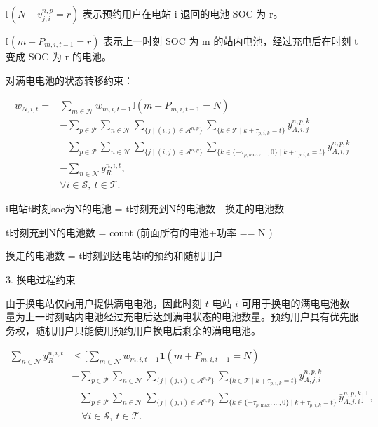 \documentclass[12pt,hyperref,a4paper,UTF8]{ctexart}
\begin{document}
$\mathbb{I}\!\left(N-v^{n,p}_{j,i}=r\right)$
表示预约用户在电站 i 退回的电池 SOC 为 r。

$\mathbb{I}\!\left(m+P_{m,i,t-1}=r\right)$
表示上一时刻 SOC 为 m 的站内电池，经过充电后在时刻 t 变成 SOC 为 r 的电池。

对满电电池的状态转移约束：

\begin{equation}
\begin{aligned}
w_{N,i,t}
=&
\sum_{m\in \mathcal{N}}
w_{m,i,t-1}
\mathbb{I}\!\left(m+P_{m,i,t-1}=N\right)
\\
&-
\sum_{p\in \mathcal{P}}
\sum_{n\in \mathcal{N}}
\sum_{\{j\mid (i,j)\in \mathcal{A}^{n,p}\}}
\sum_{\{k\in \mathcal{T}\mid k+\tau_{p,i,k}=t\}}
y^{n,p,k}_{A,i,j}
\\
&-
\sum_{p\in \mathcal{P}}
\sum_{n\in \mathcal{N}}
\sum_{\{j\mid (i,j)\in \mathcal{A}^{n,p}\}}
\sum_{\{k\in \{-\tau_{p,max},\ldots,0\}\mid k+\tau_{p,i,k}=t\}}
\bar{y}^{n,p,k}_{A,i,j}
\\
&-
\sum_{n\in \mathcal{N}}
y^{n,i,t}_{R},
\\
&\forall i\in \mathcal{S},\ t\in \mathcal{T}.
\end{aligned}
\tag{7b}
\end{equation}

i电站t时刻soc为N的电池 = t时刻充到N的电池数 - 换走的电池数

t时刻充到N的电池数 = count (前面所有的电池+功率 == N )

换走的电池数 = t时刻到达电站i的预约和随机用户


3. 换电过程约束

由于换电站仅向用户提供满电电池，因此时刻 $t$ 电站 $i$ 可用于换电的满电电池数量为上一时刻站内电池经过充电后达到满电状态的电池数量。预约用户具有优先服务权，随机用户只能使用预约用户换电后剩余的满电电池。

\begin{equation}
\begin{aligned}
\sum_{n\in \mathcal{N}} y^{n,i,t}_{R}
&\le
\biggl[
\sum_{m\in \mathcal{N}} w_{m,i,t-1}
\mathbf{1}\!\left(m+P_{m,i,t-1}=N\right) \\
&-
\sum_{p\in \mathcal{P}}
\sum_{n\in \mathcal{N}}
\sum_{\{j\mid (j,i)\in \mathcal{A}^{n,p}\}}
\sum_{\{k\in \mathcal{T}\mid k+\tau_{p,i,k}=t\}}
y^{n,p,k}_{A,j,i} \\
&-
\sum_{p\in \mathcal{P}}
\sum_{n\in \mathcal{N}}
\sum_{\{j\mid (j,i)\in \mathcal{A}^{n,p}\}}
\sum_{\{k\in \{-\tau_{p,\mathrm{max}},\ldots,0\}\mid k+\tau_{p,i,k}=t\}}
\bar{y}^{n,p,k}_{A,j,i}\biggr]^+, \\
&\quad \forall i\in \mathcal{S},\ t\in \mathcal{T}.
\end{aligned}
\tag{8a}
\end{equation}
\end{document}
